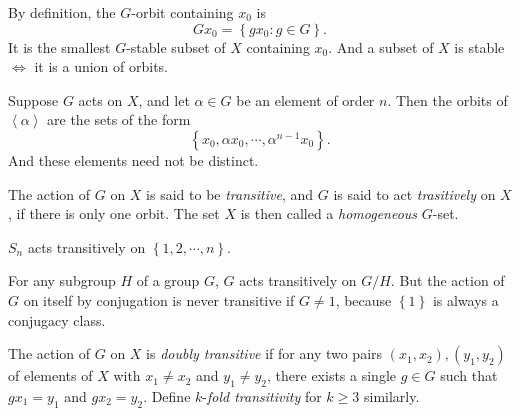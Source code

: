 \begin{remark}
  \label{remark-G-orbit}
  By definition, the \( G \)-orbit containing \( x_0 \) is
  \[
    G x_0 = \left\lbrace g x_0: g \in G \right\rbrace.
  \]
  It is the smallest \( G \)-stable subset of \( X \) containing \( x_0 \).
  And a subset of \( X \) is stable \( \iff \) it is a union of orbits.
\end{remark}

\begin{example}
  \label{example-cyclic-action}
  Suppose \( G \) acts on \( X \), and let \( \alpha \in G \) be an element of order \( n \).
  Then the orbits of \( \left\langle \alpha \right\rangle \) are the sets of the form
  \[
    \left\lbrace x_0, \alpha x_0, \cdots, \alpha^{n - 1}x_0 \right\rbrace.
  \]
  And these elements need not be distinct.
\end{example}


\begin{definition}
  \label{definition-transitive}
  \label{definition-homogeneous}
  The action of \( G \) on \( X \) is said to be \emph{transitive}, and \( G \) is said to act \emph{trasitively} on \( X \), if there is only one orbit.
  The set \( X \) is then called a \emph{homogeneous} \( G \)-set.
\end{definition}

\begin{example}
  \label{example-symmetric-group-transitive-action}
  \( S_n \) acts transitively on \( \left\lbrace 1, 2, \cdots, n \right\rbrace \).
\end{example}

\begin{example}
  \label{example-transitive}
  For any subgroup \( H \) of a group \( G \), \( G \) acts transitively on \( G / H \).
  But the action of \( G \) on itself by conjugation is never transitive if \( G \neq 1 \), because \( \left\lbrace 1 \right\rbrace \) is always a conjugacy class.
\end{example}

\begin{definition}
  \label{definition-doubly-transitive}
  The action of \( G \) on \( X \) is \emph{doubly transitive} if for any two pairs \( (x_1, x_2), (y_1, y_2) \) of elements of \( X \) with \( x_1 \neq x_2 \) and \( y_1 \neq y_2 \), there exists a single \( g \in G \) such that \( gx_1 = y_1 \) and \( gx_2 = y_2 \).
  Define \( k \)-\emph{fold transitivity} for \( k \geq 3 \) similarly.
\end{definition}


